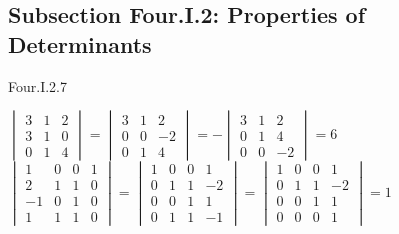 \subsection{Subsection Four.I.2: Properties of Determinants}
\begin{ans}{Four.I.2.7}
      \begin{exparts}
      \partsitem \( \begin{vmatrix}
                 3  &1  &2  \\
                 3  &1  &0  \\
                 0  &1  &4
               \end{vmatrix}
               =
               \begin{vmatrix}
                 3  &1  &2  \\
                 0  &0  &-2 \\
                 0  &1  &4
               \end{vmatrix}
               =
               -\begin{vmatrix}
                 3  &1  &2  \\
                 0  &1  &4  \\
                 0  &0  &-2
               \end{vmatrix}
               =6  \)
      \partsitem \( \begin{vmatrix}
                 1  &0  &0  &1 \\
                 2  &1  &1  &0 \\
                -1  &0  &1  &0 \\
                 1  &1  &1  &0
               \end{vmatrix}
               =
               \begin{vmatrix}
                 1  &0  &0  &1 \\
                 0  &1  &1  &-2\\
                 0  &0  &1  &1 \\
                 0  &1  &1  &-1
               \end{vmatrix}
               =
               \begin{vmatrix}
                 1  &0  &0  &1 \\
                 0  &1  &1  &-2\\
                 0  &0  &1  &1 \\
                 0  &0  &0  &1
               \end{vmatrix}
               =1    \)
      \end{exparts}
    
\end{ans}

